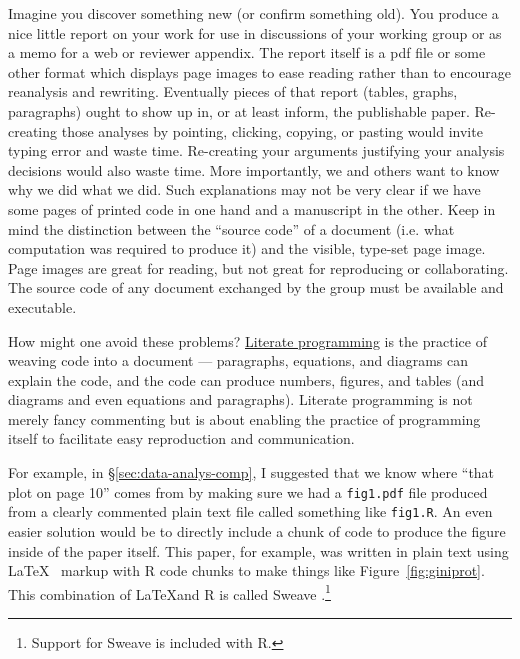 \documentclass[12pt]{article}
\begin{document}
Imagine you discover something new (or confirm something old). You
produce a nice little report on your work for use in discussions of
your working group or as a memo for a web or reviewer appendix. The
report itself is a pdf file or some other format which displays page
images to ease reading rather than to encourage reanalysis and
rewriting. Eventually pieces of that report (tables, graphs,
paragraphs) ought to show up in, or at least inform, the publishable
paper. Re-creating those analyses by pointing, clicking, copying, or
pasting would invite typing error and waste time. Re-creating your
arguments justifying your analysis decisions would also waste
time. More importantly, we and others want to know why we did what we
did. Such explanations may not be very clear if we have some pages of
printed code in one hand and a manuscript in the other. Keep in mind
the distinction between the ``source code'' of a document (i.e. what
computation was required to produce it) and the visible, type-set page
image. Page images are great for reading, but not great for
reproducing or collaborating. The source code of any document
exchanged by the group must be available and executable.

How might one avoid these problems?
\href{http://en.wikipedia.org/wiki/Literate_programming}{Literate
  programming} is the practice of weaving code into a document ---
paragraphs, equations, and diagrams can explain the code, and the code
can produce numbers, figures, and tables (and diagrams and even equations and
paragraphs). Literate programming is not merely fancy commenting but
is about enabling the practice of programming itself to facilitate easy
reproduction and communication.

For example, in \S\ref{sec:data-analys-comp}, I suggested that we know
where ``that plot on page 10'' comes from by making sure we had a
\Verb+fig1.pdf+ file produced from a clearly commented plain text file
called something like \Verb+fig1.R+.  An even easier solution would be to
directly include a chunk of code to produce the figure inside of the
paper itself. This paper, for example, was written in plain text using
\LaTeX~ markup with R code chunks to make things like
Figure~\ref{fig:giniprot}. This combination of \LaTeX and R is called
Sweave \citep{Leis:2005}.\footnote{Support for Sweave is included with
  R.}
\end{document}
